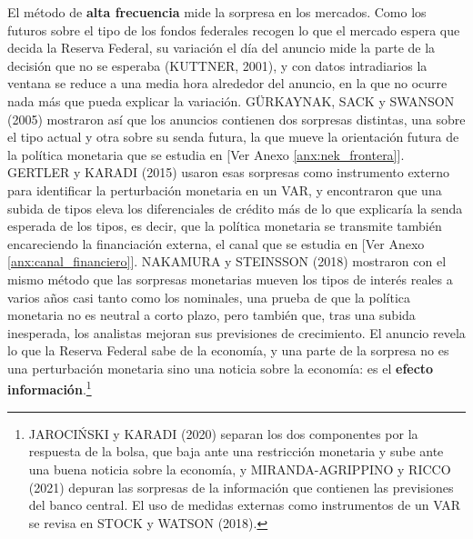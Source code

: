\documentclass[10pt,a4paper]{article}
\newcommand{\authorfont}[1]{{\fontfamily{EBGaramond-TLF}\selectfont #1}}
\begin{document}
El método de \textbf{alta frecuencia} mide la sorpresa en los mercados. Como los futuros sobre el tipo de los fondos federales recogen lo que el mercado espera que decida la Reserva Federal, su variación el día del anuncio mide la parte de la decisión que no se esperaba (KUTTNER, 2001), y con datos intradiarios la ventana se reduce a una media hora alrededor del anuncio, en la que no ocurre nada más que pueda explicar la variación. GÜRKAYNAK, SACK y SWANSON (2005) mostraron así que los anuncios contienen dos sorpresas distintas, una sobre el tipo actual y otra sobre su senda futura, la que mueve la orientación futura de la política monetaria que se estudia en [\authorfont{Ver Anexo \ref{anx:nek_frontera}}]. GERTLER y KARADI (2015) usaron esas sorpresas como instrumento externo para identificar la perturbación monetaria en un VAR, y encontraron que una subida de tipos eleva los diferenciales de crédito más de lo que explicaría la senda esperada de los tipos, es decir, que la política monetaria se transmite también encareciendo la financiación externa, el canal que se estudia en [\authorfont{Ver Anexo \ref{anx:canal_financiero}}]. NAKAMURA y STEINSSON (2018) mostraron con el mismo método que las sorpresas monetarias mueven los tipos de interés reales a varios años casi tanto como los nominales, una prueba de que la política monetaria no es neutral a corto plazo, pero también que, tras una subida inesperada, los analistas mejoran sus previsiones de crecimiento. El anuncio revela lo que la Reserva Federal sabe de la economía, y una parte de la sorpresa no es una perturbación monetaria sino una noticia sobre la economía: es el \textbf{efecto información}.\footnote{%
    JAROCIŃSKI y KARADI (2020) separan los dos componentes por la respuesta de la bolsa, que baja ante una restricción monetaria y sube ante una buena noticia sobre la economía, y MIRANDA-AGRIPPINO y RICCO (2021) depuran las sorpresas de la información que contienen las previsiones del banco central. El uso de medidas externas como instrumentos de un VAR se revisa en STOCK y WATSON (2018).
}
\end{document}
